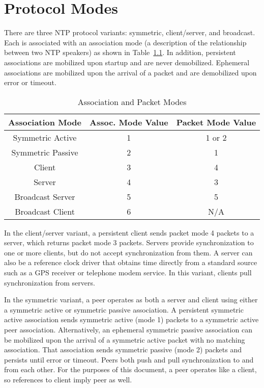 \chapter{Protocol Modes}
\label{section-3}

There are three NTP protocol variants: symmetric, client/server, and
broadcast. Each is associated with an association mode (a
description of the relationship between two NTP speakers) as shown in
Table~\ref{association_and_packet_modes}. In addition, persistent associations are mobilized upon
startup and are never demobilized. Ephemeral associations are
mobilized upon the arrival of a packet and are demobilized upon error
or timeout.

\begin{table}[htb]
\center
\begin{tabular}{c | c | c}
Association Mode & Assoc. Mode Value & Packet Mode Value \\
\hline
\hline
Symmetric Active & 1 & 1 or 2 \\
Symmetric Passive & 2 & 1 \\
Client & 3 & 4 \\
Server & 4 & 3 \\
Broadcast Server & 5 & 5 \\
Broadcast Client & 6 & N/A \\
\hline
\end{tabular}
\label{association_and_packet_modes}
\caption{Association and Packet Modes}
\end{table}

In the client/server variant, a persistent client sends packet mode 4
packets to a server, which returns packet mode 3 packets. Servers
provide synchronization to one or more clients, but do not accept
synchronization from them. A server can also be a reference clock
driver that obtains time directly from a standard source such as a
GPS receiver or telephone modem service. In this variant, clients
pull synchronization from servers.

In the symmetric variant, a peer operates as both a server and client
using either a symmetric active or symmetric passive association. A
persistent symmetric active association sends symmetric active (mode
1) packets to a symmetric active peer association. Alternatively, an
ephemeral symmetric passive association can be mobilized upon the
arrival of a symmetric active packet with no matching association.
That association sends symmetric passive (mode 2) packets and
persists until error or timeout. Peers both push and pull
synchronization to and from each other. For the purposes of this
document, a peer operates like a client, so references to client
imply peer as well.

